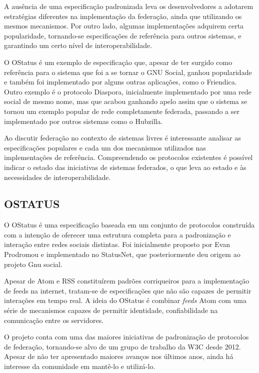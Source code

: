 A ausência de uma especificação padronizada leva os desenvolvedores a adotarem
estratégias diferentes na implementação da federação, ainda que utilizando os mesmos
mecanismos. Por outro lado, algumas implementações adquirem certa popularidade,
tornando-se especificações de referência para outros sistemas, e garantindo um certo
nível de interoperabilidade.

O OStatus é um exemplo de especificação que, apesar de ter surgido como referência
para o sistema que foi a se tornar o GNU Social, ganhou popularidade e também foi
implementado por alguns outras aplicações, como o Friendica. Outro exemplo é o
protocolo Diaspora, inicialmente implementado por uma rede social de mesmo nome, mas
que acabou ganhando apelo assim que o sistema se tornou um exemplo popular de rede
completamente federada, passando a ser implementado por outros sistemas como o
Hubzilla.

Ao discutir federação no contexto de sistemas livres é interessante analisar as
especificações populares e cada um dos mecanismos utilizados nas implementações de
referência. Compreendendo os protocolos existentes é possível indicar o estado das
iniciativas de sistemas federados, o que leva ao estado e às necessidades de
interoperabilidade.

\subsection{OSTATUS}

O OStatus é uma especificação baseada em um conjunto de protocolos construída com a
intenção de oferecer uma estrutura completa para a padronização e interação entre
redes sociais distintas. Foi inicialmente proposto por Evan Prodromou e implementado
no StatusNet, que posteriormente deu origem ao projeto Gnu social.

Apesar de Atom e RSS constituírem padrões corriqueiros para a implementação de feeds
na internet, tratam-se de especificações que não são capazes de permitir interações
em tempo real. A ideia do OStatus é combinar \textit{feeds} Atom com uma série de
mecanismos capazes de permitir identidade, confiabilidade na comunicação entre os
servidores.

O projeto conta com uma das maiores iniciativas de padronização de protocolos de
federação, tornando-se alvo de um grupo de trabalho da W3C desde 2012. Apesar de não
ter apresentado maiores avanços nos últimos anos, ainda há interesse da comunidade em
mantê-lo e utilizá-lo. 

